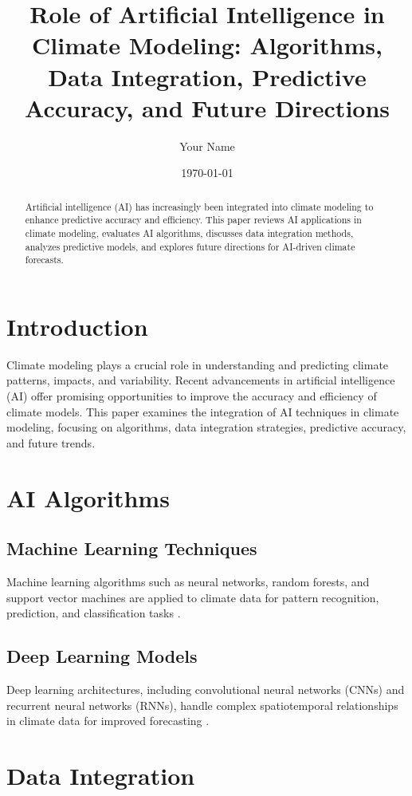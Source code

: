 \documentclass[12pt]{article}
\title{Role of Artificial Intelligence in Climate Modeling: Algorithms, Data Integration, Predictive Accuracy, and Future Directions}
\author{Your Name}
\date{\today}
\begin{document}
\maketitle

\begin{abstract}
Artificial intelligence (AI) has increasingly been integrated into climate modeling to enhance predictive accuracy and efficiency. This paper reviews AI applications in climate modeling, evaluates AI algorithms, discusses data integration methods, analyzes predictive models, and explores future directions for AI-driven climate forecasts.
\end{abstract}

\section{Introduction}
Climate modeling plays a crucial role in understanding and predicting climate patterns, impacts, and variability. Recent advancements in artificial intelligence (AI) offer promising opportunities to improve the accuracy and efficiency of climate models. This paper examines the integration of AI techniques in climate modeling, focusing on algorithms, data integration strategies, predictive accuracy, and future trends.

\section{AI Algorithms}
\subsection{Machine Learning Techniques}
Machine learning algorithms such as neural networks, random forests, and support vector machines are applied to climate data for pattern recognition, prediction, and classification tasks \citep{chen2018deep, rathore2020machine}.

\subsection{Deep Learning Models}
Deep learning architectures, including convolutional neural networks (CNNs) and recurrent neural networks (RNNs), handle complex spatiotemporal relationships in climate data for improved forecasting \citep{schneider2017deep, ma2019deep}.

\section{Data Integration}
\end{document}
